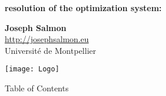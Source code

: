 \documentclass[unknownkeysallowed]{beamer}
\begin{document}
\begin{frame}
\bigskip
\bigskip
\begin{center}{
\LARGE\color{marron}
\textbf{resolution of the optimization system:}
\textbf{ }\\
\vspace{0.5cm}
}

\color{marron}
\end{center}

\vspace{0.5cm}

\begin{center}
\textbf{Joseph Salmon} \\
\vspace{0.1cm}
\url{http://josephsalmon.eu}\\
\vspace{0.5cm}
Université de Montpellier \\
\end{center}

\centering
\texttt{[image: Logo]}

\end{frame}






\begin{frame}{Table of Contents}
\tableofcontents[hideallsubsections]
\end{frame}







\end{document}
